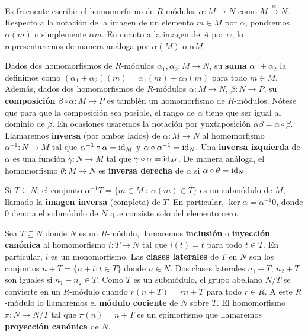 Es frecuente escribir el homomorfismo de \(R\)-módulos \(\alpha: M \rightarrow N\) como
\(M \xrightarrow{\alpha}N\). Respecto a la notación de la imagen de un elemento
\(m \in M\) por \(\alpha\), pondremos \(\alpha(m)\) o simplemente \(\alpha m\). En
cuanto a la imagen de \(A\) por \(\alpha\), lo representaremos de manera análoga por
\(\alpha(M)\) o \(\alpha M\).

Dados dos homomorfismos de \(R\)-módulos \(\alpha_{1}, \alpha_{2}: M \rightarrow N\),
su \textbf{suma} \(\alpha_{1}+ \alpha_{2}\) la definimos como \((\alpha_{1}+ \alpha_{2}
)(m) = \alpha_{1}(m) + \alpha_{2}(m)\) para todo \(m \in M\). Además, dados dos homomorfismos
de \(R\)-módulos \(\alpha: M \rightarrow N\), \(\beta: N \rightarrow P\), su \textbf{composición}
\(\beta \circ \alpha: M \rightarrow P\) es también un homomorfismo de \(R\)-módulos.
Nótese que para que la composición sea posible, el rango de \(\alpha\) tiene que
ser igual al dominio de \(\beta\). En ocasiones usaremos la notación por yuxtaposición
\(\alpha\beta = \alpha \circ \beta\). Llamaremos \textbf{inversa} (por ambos lados)
de \(\alpha : M \rightarrow N\) al homomorfismo \(\alpha^{-1}: N \rightarrow M\) tal
que \(\alpha^{-1}\circ \alpha = \operatorname{id}_{M}\) y \(\alpha \circ \alpha^{-1}= \operatorname{id}_{N}\).
Una \textbf{inversa izquierda} de \(\alpha\) es una función \(\gamma: N \rightarrow
M\) tal que \(\gamma \circ \alpha = \operatorname{id}_{M}\). De manera análoga, el homomorfismo \(\theta
: M \to N\) es \textbf{inversa derecha} de \(\alpha\) si
\(\alpha \circ \theta = \operatorname{id}_{N}\).

Si \(T \subseteq N\), el conjunto \(\alpha^{-1}T = \{ m \in M \ : \ \alpha(m) \in T
\}\) es un submódulo de \(M\), llamado la \textbf{imagen inversa} (completa) de \(T\).
En particular, \(\ker \alpha = \alpha^{-1}0\), donde \(0\) denota el submódulo de
\(N\) que consiste solo del elemento cero.

Sea \(T \subseteq N\) donde \(N\) es un \(R\)-módulo, llamaremos \textbf{inclusión} o
\textbf{inyección canónica} al homomorfismo \(i: T \rightarrow N\) tal que \(i(t) =
t\) para todo \(t \in T\). En particular, \(i\) es un monomorfismo. Las \textbf{clases
	laterales} de \(T\) en \(N\) son los conjuntos \(n + T = \{n + t : t \in T\}\) donde \(n
\in N\). Dos clases laterales \(n_{1}+ T\), \(n_{2}+ T\) son iguales si \(n_{1}- n_{2}\in
T\). Como \(T\) es un submódulo, el grupo abeliano \(N/T\) se convierte en un \(R\)-módulo
cuando \(r(n+T) = rn + T\) para todo \(r \in R\). A este \(R\)-módulo lo llamaremos el
\textbf{módulo cociente} de \(N\) sobre \(T\). El homomorfismo
\(\pi: N \rightarrow N/ T\) tal que \(\pi(n) = n + T\) es un epimorfismo que
llamaremos \textbf{proyección canónica} de \(N\).

